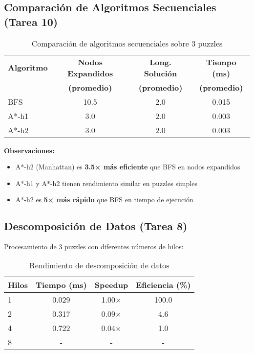 \documentclass[12pt,a4paper]{article}
\begin{document}
\subsection{Comparación de Algoritmos Secuenciales (Tarea 10)}

\begin{table}[h]
\centering
\caption{Comparación de algoritmos secuenciales sobre 3 puzzles}
\begin{tabular}{@{}lccc@{}}
\toprule
\textbf{Algoritmo} & \textbf{Nodos Expandidos} & \textbf{Long. Solución} & \textbf{Tiempo (ms)} \\
 & \textbf{(promedio)} & \textbf{(promedio)} & \textbf{(promedio)} \\
\midrule
BFS & 10.5 & 2.0 & 0.015 \\
A*-h1 & 3.0 & 2.0 & 0.003 \\
A*-h2 & 3.0 & 2.0 & 0.003 \\
\bottomrule
\end{tabular}
\end{table}

\textbf{Observaciones:}
\begin{itemize}
    \item A*-h2 (Manhattan) es \textbf{3.5× más eficiente} que BFS en nodos expandidos
    \item A*-h1 y A*-h2 tienen rendimiento similar en puzzles simples
    \item A*-h2 es \textbf{5× más rápido} que BFS en tiempo de ejecución
\end{itemize}

\subsection{Descomposición de Datos (Tarea 8)}

Procesamiento de 3 puzzles con diferentes números de hilos:

\begin{table}[h]
\centering
\caption{Rendimiento de descomposición de datos}
\begin{tabular}{@{}lccc@{}}
\toprule
\textbf{Hilos} & \textbf{Tiempo (ms)} & \textbf{Speedup} & \textbf{Eficiencia (\%)} \\
\midrule
1 & 0.029 & 1.00× & 100.0 \\
2 & 0.317 & 0.09× & 4.6 \\
4 & 0.722 & 0.04× & 1.0 \\
8 & - & - & - \\
\bottomrule
\end{tabular}
\end{table}
\end{document}
